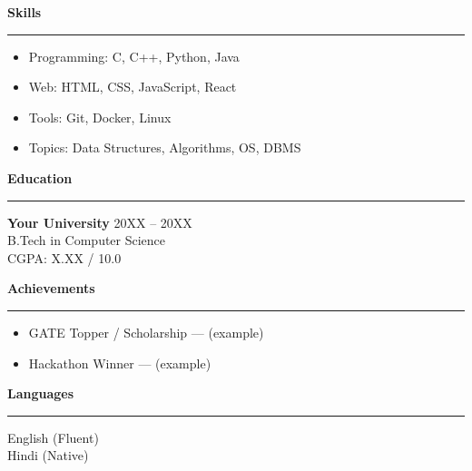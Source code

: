 \documentclass[11pt]{article}
\newcommand{\headingfont}{\sffamily}
\newcommand{\sectitle}[1]{%
  \vspace{4pt}\noindent\textbf{\large\headingfont\color{accent}#1}\vspace{4pt}\par
  \vspace{3pt}\hrule\vspace{5pt}
}
\begin{document}
\noindent
\begin{minipage}[t]{0.28\textwidth}
  \sectitle{Skills}
  \begin{itemize}[leftmargin=*,noitemsep,topsep=0pt]
    \item Programming: C, C++, Python, Java
    \item Web: HTML, CSS, JavaScript, React
    \item Tools: Git, Docker, Linux
    \item Topics: Data Structures, Algorithms, OS, DBMS
  \end{itemize}

  \vspace{4pt}
  \sectitle{Education}
  \textbf{Your University} \hfill {\small 20XX -- 20XX}\\
  B.Tech in Computer Science \\
  CGPA: X.XX / 10.0

  \vspace{6pt}
  \sectitle{Achievements}
  \begin{itemize}[leftmargin=*,noitemsep,topsep=0pt]
    \item GATE Topper / Scholarship — (example)
    \item Hackathon Winner — (example)
  \end{itemize}

  \vspace{6pt}
  \sectitle{Languages}
  English (Fluent) \\
  Hindi (Native)
\end{minipage}%
\hfill
\end{document}
